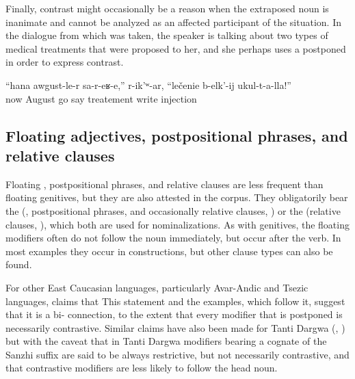 Finally, contrast might occasionally be a reason when the extraposed noun is inanimate and cannot be analyzed as an affected participant of the situation. In the dialogue from which  was taken, the speaker is talking about two types of medical treatments that were proposed to her, and she perhaps uses a postponed  in order to express contrast.
%
\begin{exe}
	\ex	\label{ex:She said, come now in August, to prescribe the cure of injections}
	\gll	``hana	awgust-le-r	sa-r-eʁ-e,''	r-ik'ʷ-ar,	``lečenie	b-elk'-ij ukul-t-a-lla!''\\
		now	August	go	say	treatement	write	injection\\
	\glt	{}
\end{exe}



\subsection{Floating adjectives, postpositional phrases, and relative clauses}
\label{ssec:Extraposed adjectives, postpositional phrases, and relative clauses}

Floating , postpositional phrases, and relative clauses are less frequent than floating genitives, but they are also attested in the corpus. They obligatorily bear the   (, postpositional phrases, and occasionally relative clauses, ) or the   (relative clauses, ), which both are used for nominalizations. As with genitives, the floating modifiers often do not follow the noun immediately, but occur after the verb. In most examples they occur in  constructions, but other clause types can also be found.

For other East Caucasian languages, particularly Avar-Andic and Tsezic languages, \citet{Testelec1998a} claims that  This statement and the examples, which follow it, suggest that it is a bi- connection, to the extent that every modifier that is postponed is necessarily contrastive. Similar claims have also been made for Tanti Dargwa (\citealt{Lander2014, Lander2016}, \citealt{Sumbatova.Lander2014}) but with the caveat that in Tanti Dargwa modifiers bearing a cognate of the Sanzhi suffix  are said to be always restrictive, but not necessarily contrastive, and that contrastive modifiers are less likely to follow the head noun.

